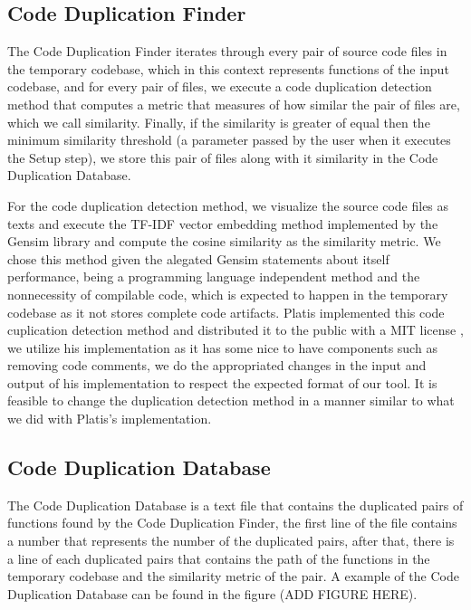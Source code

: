 \subsection{Code Duplication Finder}

The Code Duplication Finder iterates through every pair of source code files in the temporary codebase, which in this context represents
functions of the input codebase, and for every pair of files, we execute a code duplication detection method that computes a metric
that measures of how similar the pair of files are, which we call similarity. Finally, if the similarity is greater of equal then the
minimum similarity threshold (a parameter passed by the user when it executes the Setup step), we store this pair of files along with
it similarity in the Code Duplication Database.

For the code duplication detection method, we visualize the source code files as texts and execute the TF-IDF vector embedding method
implemented by the Gensim library \citep{gensim} and compute the cosine similarity as the similarity metric. We chose this method 
given the alegated Gensim statements about itself performance, being a programming language independent method and the nonnecessity of 
compilable code, which is expected to happen in the temporary codebase as it not stores complete code artifacts. Platis implemented
this code cuplication detection method and distributed it to the public with a MIT license \citep{platistool} \citep{mitlicense}, 
we utilize his implementation as it has some nice to have components such as removing code comments, we do the appropriated changes
in the input and output of his implementation to respect the expected format of our tool. 
It is feasible to change the duplication detection method in a manner similar to what we did with Platis's implementation.

\subsection{Code Duplication Database}

The Code Duplication Database is a text file that contains the duplicated pairs of functions found by the Code Duplication Finder, 
the first line of the file contains a number that represents the number of the duplicated pairs, after that, there is 
a line of each duplicated pairs that contains the path of the functions in the temporary codebase and the similarity metric of the 
pair. A example of the Code Duplication Database can be found in the figure (ADD FIGURE HERE). 

